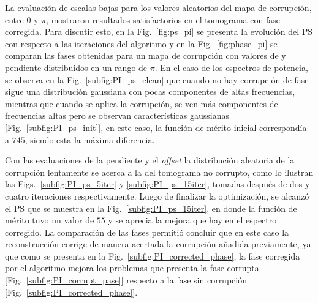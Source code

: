 La evaluación de escalas bajas para los valores aleatorios del mapa de corrupción, entre $0$ y $\pi$, mostraron resultados satisfactorios en el tomograma con fase corregida. Para discutir esto, en la Fig.~\ref{fig:ps_pi} se presenta la evolución del PS con respecto a las iteraciones del algoritmo y en la Fig.~\ref{fig:phase_pi} se comparan las fases obtenidas para un mapa de corrupción con valores de \offset y pendiente distribuidos en un rango de $\pi$. En el caso de los espectros de potencia, se observa en la Fig.~\ref{subfig:PI_ps_clean} que cuando no hay corrupción de fase sigue una distribución gaussiana con pocas componentes de altas frecuencias, mientras que cuando se aplica la corrupción, se ven más componentes de frecuencias altas pero se observan características gaussianas [Fig.~\ref{subfig:PI_ps_init}], en este caso, la función de mérito inicial correspondía a $745$, siendo esta la máxima diferencia. 

Con las evaluaciones de la pendiente y el \textit{offset} la distribución aleatoria de la corrupción lentamente se acerca a la del tomograma no corrupto, como lo ilustran las Figs.~\ref{subfig:PI_ps_5iter} y \ref{subfig:PI_ps_15iter}, tomadas después de dos y cuatro iteraciones respectivamente. Luego de finalizar la optimización, se alcanzó el PS que se muestra en la Fig.~\ref{subfig:PI_ps_15iter}, en donde la función de mérito tuvo un valor de $55$ y se aprecia la mejora que hay en el espectro corregido. La comparación de las fases permitió concluir que en este caso la reconstrucción corrige de manera acertada la corrupción añadida previamente, ya que como se presenta en la Fig.~\ref{subfig:PI_corrected_phase}, la fase corregida por el algoritmo mejora los problemas que presenta la fase corrupta [Fig.~\ref{subfig:PI_corrupt_pase}] respecto a la fase sin corrupción [Fig.~\ref{subfig:PI_corrected_phase}].

